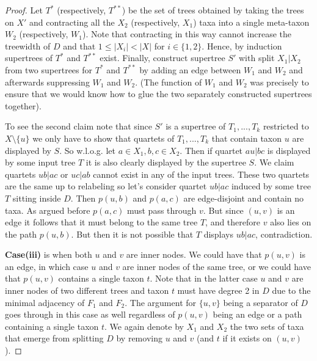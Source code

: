 \begin{proof}
Let $T^*$ (respectively, $T^{**}$) be the set of trees obtained by taking the trees on $X'$ and contracting all the $X_2$ (respectively, $X_1$) taxa into a single meta-taxon $W_2$ (respectively, $W_1$). Note that contracting in this way cannot increase the treewidth of $D$ and that $1 \leq |X_i| < |X|$ for $i\in\{1,2\}$. Hence, by induction supertrees of $T^*$ and $T^{**}$ exist. Finally, construct supertree $S'$ with split $X_1|X_2$ from two supertrees for $T^*$ and $T^{**}$ by adding an edge between $W_1$ and $W_2$ and afterwards suppressing $W_1$ and $W_2$. (The function of $W_1$ and $W_2$ was precisely to ensure that we would know how to glue the two separately constructed supertrees together).

To see the second claim note that since $S'$ is a supertree of $T_1,...,T_k$ restricted to $X\setminus \{u\}$ we only have to show that quartets of $T_1,...,T_k$ that contain taxon $u$ are displayed by $S$. So w.l.o.g. let $a \in X_1, b,c \in X_2$. Then if quartet $au|bc$ is displayed by some input tree $T$ it is also clearly displayed by the supertree $S$. We claim quartets $ub|ac$ or $uc|ab$ cannot exist in any of the input trees. These two quartets are the same up to relabeling so let's consider quartet $ub|ac$ induced by some tree $T$ sitting inside $D$. Then $p(u,b)$ and $p(a,c)$ are edge-disjoint and contain no taxa. As argued before $p(a,c)$ must pass through $v$. But since $(u,v)$ is an edge it follows that it must belong to the same tree $T$, and therefore $v$ also lies on the path $p(u,b)$. But then it is not possible that $T$ displays $ub|ac$, contradiction.




\noindent
\textbf{Case(iii)} is when both $u$ and $v$ are inner nodes. We could have that $p(u,v)$ is an edge, in which case $u$ and $v$ are inner nodes of the same tree, or we could have that $p(u,v)$ contains a single taxon $t$. Note that in the latter case $u$ and $v$ are inner nodes of two different trees and taxon $t$ must have degree 2 in $D$ due to the minimal adjacency of $F_1$ and $F_2$. The argument for $\{u,v\}$ being a separator of $D$ goes through in this case as well regardless of $p(u,v)$ being an edge or a path containing a single taxon $t$. We again denote by $X_1$ and $X_2$ the two sets of taxa that emerge from splitting $D$ by removing $u$ and $v$ (and $t$ if it exists on $(u,v)$). 


\end{proof}
